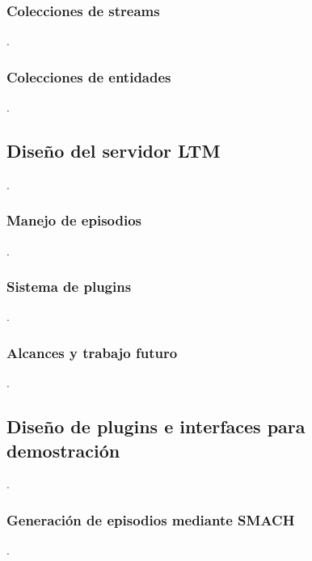 \subsubsection{Colecciones de streams}
 .

\subsubsection{Colecciones de entidades}

 .

\subsection{Diseño del servidor LTM}
 .

\subsubsection{Manejo de episodios}
 .

\subsubsection{Sistema de plugins}
 .

\subsubsection{Alcances y trabajo futuro}
 .

\subsection{Diseño de plugins e interfaces para demostración}
 .

\subsubsection{Generación de episodios mediante SMACH}
 .

